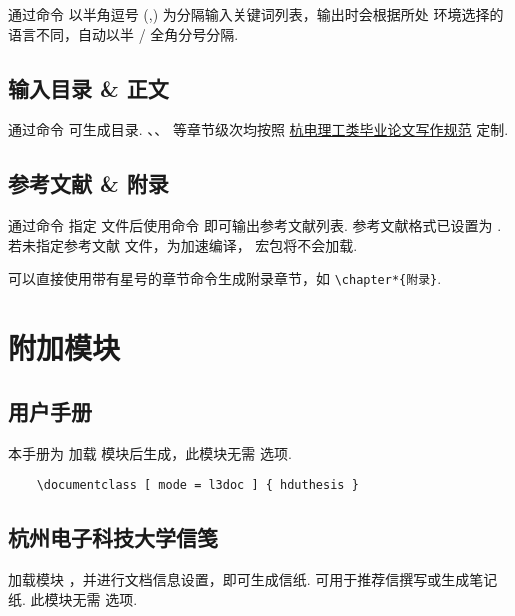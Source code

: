 通过命令  以半角逗号 (,) 为分隔输入关键词列表，输出时会根据所处  环境选择的语言不同，自动以半 / 全角分号分隔.

\subsection{输入目录 \& 正文}

通过命令  可生成目录. 、、 等章节级次均按照 \href{https://jwc.hdu.edu.cn/2022/0428/c4528a153813/page.htm}{杭电理工类毕业论文写作规范} 定制.

\subsection{参考文献 \& 附录}

通过命令  指定  文件后使用命令  即可输出参考文献列表. 参考文献格式已设置为 . 若未指定参考文献  文件，为加速编译， 宏包将不会加载.

可以直接使用带有星号的章节命令生成附录章节，如 \verb|\chapter*{附录}|.

\clearpage

\section{附加模块}

\subsection{用户手册}

本手册为  加载  模块后生成，此模块无需  选项.

\begin{framed}
  \begin{verbatim}
    \documentclass [ mode = l3doc ] { hduthesis }
  \end{verbatim}
\end{framed}

\subsection{杭州电子科技大学信笺}

加载模块 ，并进行文档信息设置，即可生成信纸. 可用于推荐信撰写或生成笔记纸.
此模块无需  选项.

